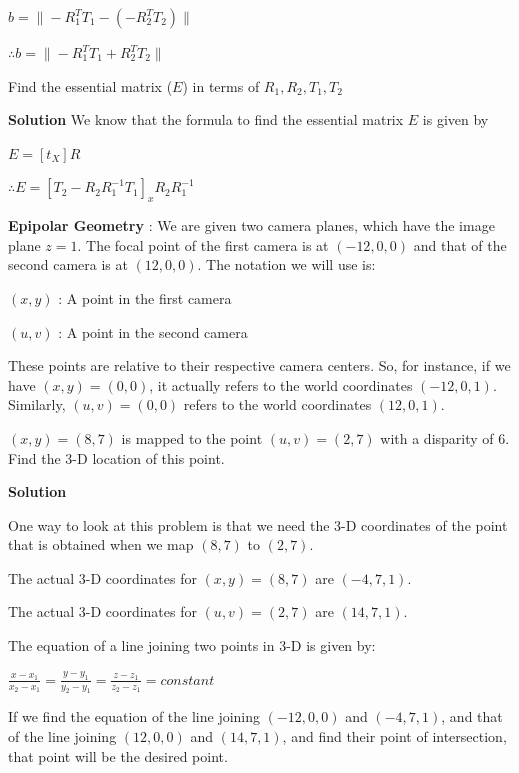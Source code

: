 \documentclass{assignment}
\begin{document}
\begin{problemlist}
\begin{legal}
$b = \|-R_1^{T}T_1 - (-R_2^{T}T_2)\|$

$\therefore b = \|-R_1^{T}T_1 + R_2^{T}T_2\|$

\item Find the essential matrix ($E$) in terms of $R_1, R_2, T_1, T_2$

\textbf{Solution} We know that the formula to find the essential matrix $E$ is given by

$E = [t_X]R$

$\therefore E = [T_2 - R_2R_1^{-1}T_1]_x R_2R_1^{-1}$

\end{legal}


\pbitem \textbf{Epipolar Geometry} : We are given two camera planes, which have the image plane $z = 1$. The focal point of the first camera is at $(-12, 0, 0)$ and that of the second camera is at $(12, 0, 0)$. The notation we will use is:

$(x, y)$ : A point in the first camera

$(u, v)$ : A point in the second camera

These points are relative to their respective camera centers. So, for instance, if we have $(x, y) = (0, 0)$, it actually refers to the world coordinates $(-12, 0, 1)$. Similarly, $(u, v) = (0, 0)$ refers to the world coordinates $(12, 0, 1)$.

\begin{legal}

\item $(x, y) = (8, 7)$ is mapped to the point $(u, v) = (2, 7)$ with a disparity of 6. Find the 3-D location of this point.

\textbf{Solution}

One way to look at this problem is that we need the 3-D coordinates of the point that is obtained when we map $(8, 7)$ to $(2, 7)$.

The actual 3-D coordinates for $(x, y) = (8, 7)$ are $(-4, 7, 1)$.

The actual 3-D coordinates for $(u, v) = (2, 7)$ are $(14, 7, 1)$.

The equation of a line joining two points in 3-D is given by:

$\frac{x - x_1}{x_2 - x_1} = \frac{y - y_1}{y_2 - y_1} = \frac{z - z_1}{z_2 - z_1} = constant$

If we find the equation of the line joining $(-12, 0, 0)$ and $(-4, 7, 1)$, and that of the line joining $(12, 0, 0)$ and $(14, 7, 1)$, and find their point of intersection, that point will be the desired point.


\end{legal}
\end{problemlist}
\end{document}
